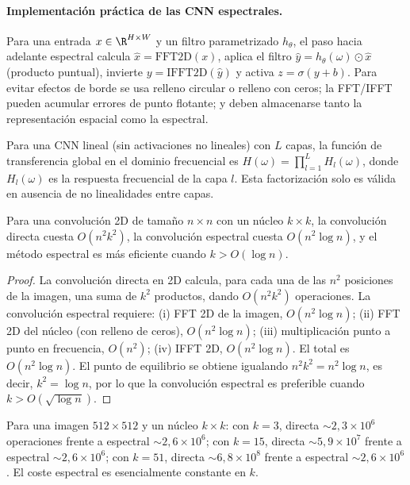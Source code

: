 \paragraph{Implementaci\'on pr\'actica de las CNN espectrales.}
Para una entrada $x \in \R^{H \times W}$ y un filtro parametrizado $h_\theta$, el
paso hacia adelante espectral calcula $\hat{x} = \mathrm{FFT2D}(x)$, aplica el
filtro $\hat{y} = h_\theta(\omega) \odot \hat{x}$ (producto puntual), invierte
$y = \mathrm{IFFT2D}(\hat{y})$ y activa $z = \sigma(y + b)$. Para evitar efectos
de borde se usa relleno circular o relleno con ceros; la FFT/IFFT pueden
acumular errores de punto flotante; y deben almacenarse tanto la
representaci\'on espacial como la espectral.

\begin{definition}
\label{def:grids:transfer-function}
Para una CNN lineal (sin activaciones no lineales) con $L$ capas, la funci\'on de
transferencia global en el dominio frecuencial es
$H(\omega) = \prod_{l=1}^L H_l(\omega)$, donde $H_l(\omega)$ es la respuesta
frecuencial de la capa $l$. Esta factorizaci\'on solo es v\'alida en ausencia de
no linealidades entre capas.
\end{definition}

\begin{theorem}
\label{thm:grids:complexity}
Para una convoluci\'on 2D de tama\~no $n \times n$ con un n\'ucleo $k \times k$,
la convoluci\'on directa cuesta $O(n^2 k^2)$, la convoluci\'on espectral cuesta
$O(n^2 \log n)$, y el m\'etodo espectral es m\'as eficiente cuando
$k > O(\log n)$.
\end{theorem}

\begin{proof}
La convoluci\'on directa en 2D calcula, para cada una de las $n^2$ posiciones de
la imagen, una suma de $k^2$ productos, dando $O(n^2 k^2)$ operaciones. La
convoluci\'on espectral requiere: (i) FFT 2D de la imagen, $O(n^2 \log n)$; (ii)
FFT 2D del n\'ucleo (con relleno de ceros), $O(n^2 \log n)$; (iii)
multiplicaci\'on punto a punto en frecuencia, $O(n^2)$; (iv) IFFT 2D,
$O(n^2 \log n)$. El total es $O(n^2 \log n)$. El punto de equilibrio se obtiene
igualando $n^2 k^2 = n^2 \log n$, es decir, $k^2 = \log n$, por lo que la
convoluci\'on espectral es preferible cuando $k > O(\sqrt{\log n})$.
\end{proof}

\begin{example}
\label{ex:grids:efficiency}
Para una imagen $512 \times 512$ y un n\'ucleo $k \times k$: con $k = 3$,
directa $\sim 2{,}3 \times 10^6$ operaciones frente a espectral
$\sim 2{,}6 \times 10^6$; con $k = 15$, directa $\sim 5{,}9 \times 10^7$ frente a
espectral $\sim 2{,}6 \times 10^6$; con $k = 51$, directa
$\sim 6{,}8 \times 10^8$ frente a espectral $\sim 2{,}6 \times 10^6$. El coste
espectral es esencialmente constante en $k$.
\end{example}

